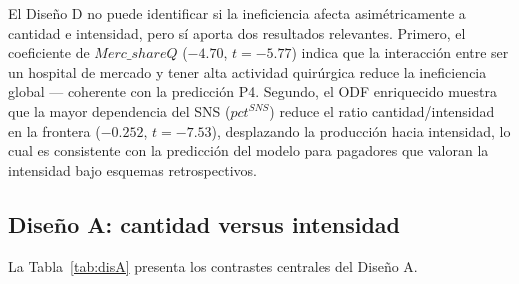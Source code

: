 \documentclass[12pt, a4paper]{article}
\begin{document}
El Diseño D no puede identificar si la ineficiencia
afecta asimétricamente a cantidad e intensidad, pero
sí aporta dos resultados relevantes. Primero, el
coeficiente de $Merc\_shareQ$ ($-4.70$, $t=-5.77$)
indica que la interacción entre ser un hospital de
mercado y tener alta actividad quirúrgica reduce la
ineficiencia global --- coherente con la predicción P4.
Segundo, el ODF enriquecido muestra que la mayor
dependencia del SNS ($pct^{SNS}$) reduce el ratio
cantidad/intensidad en la frontera ($-0.252$,
$t=-7.53$), desplazando la producción hacia intensidad,
lo cual es consistente con la predicción del modelo para
pagadores que valoran la intensidad bajo esquemas
retrospectivos.

\subsection{Diseño A: cantidad versus intensidad}

La Tabla~\ref{tab:disA} presenta los contrastes
centrales del Diseño A.
\end{document}
